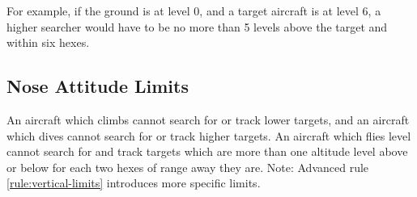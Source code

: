 For example, if the ground is at level 0, and a target aircraft is at level 6, a higher searcher would have to be no more than 5 levels above the target and within six hexes.


\subsection{Nose Attitude Limits} An aircraft which climbs cannot search for or track lower targets, and an aircraft which dives cannot search for or track higher targets. An aircraft which flies level cannot search for and track targets which are more than one altitude level above or below for each two hexes of range away they are. Note: Advanced rule \ref{rule:vertical-limits} introduces more specific limits.

